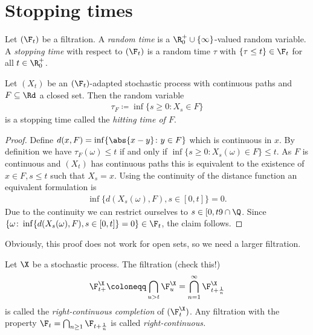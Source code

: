 \section*{Stopping times}

\begin{defi}
Let $(\F_t)$ be a filtration. A \emph{random time} is a $\R_0^+\cup \{\infty\}$-valued random variable.
A \emph{stopping time} with respect to $(\F_t)$ is a random time $\tau$ with $\{\tau \leq t\} \in \F_t$ for all $t \in \R_0^+$.
\end{defi}

\begin{bsp}
Let $(X_t)$ be an $(\F_t)$-adapted stochastic process with continuous paths and $F\subseteq \Rd$ a closed set. Then the random variable
\begin{align*}
\tau_F\coloneqq \inf\{s\geq 0\colon X_s \in F\}
\end{align*}
is a stopping time called the \emph{hitting time of $F$}.
\end{bsp}
\begin{proof}
Define $d(x,F)=\inf\{\abs{x-y}\colon y \in F\}$ which is continuous in $x$.
By definition we have $\tau_F(\omega)\leq t$ if and only if $\inf\{s\geq 0 \colon X_s(\omega)\in F\} \leq t$. As $F$ is continuous and $(X_t)$ has continuous paths this is equivalent to the existence of $x\in F, s\leq t$ such that $X_s=x$.
Using the continuity of the distance function an equivalent formulation is
\begin{align*}
\inf\{d(X_s(\omega),F),s\in [0,t]\}=0.
\end{align*}
Due to the continuity we can restrict ourselves to $s\in [0,t9\cap \Q$.
Since $\{\omega \colon \inf\{d(X_s(\omega),F),s\in [0,t]\}=0\} \in \F_t$, the claim follows.
\end{proof}

Obviously, this proof does not work for open sets, so we need a larger filtration.

\begin{defi}
Let $\X$ be a stochastic process. The filtration (check this!)
\begin{align*}
\F_{t+}^\X\coloneqq \bigcap_{u>t} \F_u^\X=\bigcap_{n=1}^\infty \F_{t+\frac{1}{n}}^\X
\end{align*}
is called the \emph{right-continuous completion} of $(\F_t^\X)$.
Any filtration with the property $\F_t=\bigcap_{n\geq 1} \F_{t+\frac{1}{n}}$ is called \emph{right-continuous.}
\end{defi}

